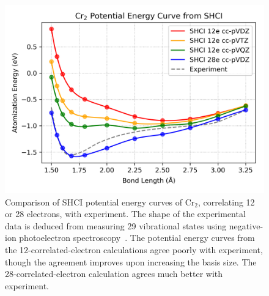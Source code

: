 \label{sec:curve}
\begin{figure}
  \begin{center}
  \includegraphics[width=0.9\linewidth]{figs/cr2curve.png}
  \caption{Comparison of SHCI potential energy curves of Cr$_2$, correlating 12 or 28 electrons, with experiment.
  The shape of the experimental data is deduced from measuring 29 vibrational states using negative-ion photoelectron spectroscopy~\cite{casey1993negative}.
  The potential energy curves from the 12-correlated-electron calculations agree poorly with experiment, though the agreement
  improves upon increasing the basis size.
  The 28-correlated-electron calculation agrees much better with experiment.
  }
  \label{fig:cr2curve}
  \end{center}
\end{figure}


